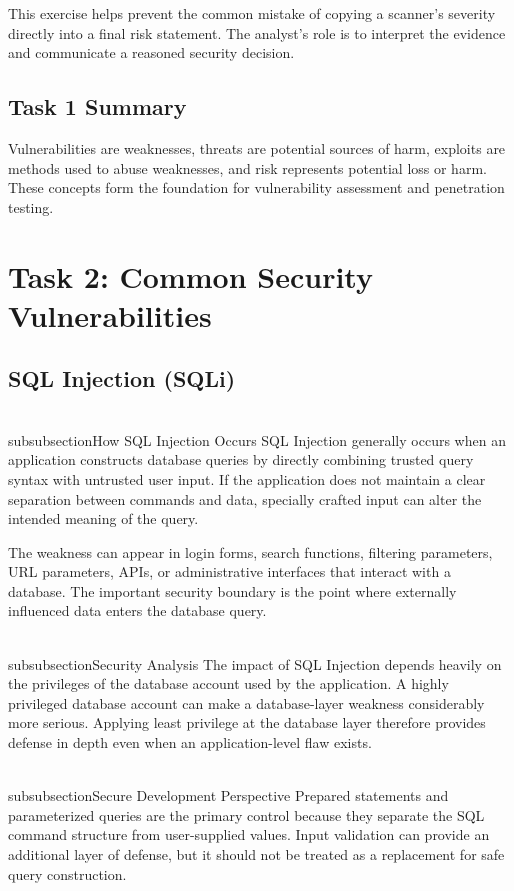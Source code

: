 \documentclass[11pt,a4paper]{article}
\begin{document}
This exercise helps prevent the common mistake of copying a scanner's severity directly into a final risk statement. The analyst's role is to interpret the evidence and communicate a reasoned security decision.

\subsection{Task 1 Summary}
Vulnerabilities are weaknesses, threats are potential sources of harm, exploits are methods used to abuse weaknesses, and risk represents potential loss or harm. These concepts form the foundation for vulnerability assessment and penetration testing.

\newpage
\section{Task 2: Common Security Vulnerabilities}

\subsection{SQL Injection (SQLi)}
\\subsubsection{How SQL Injection Occurs}
SQL Injection generally occurs when an application constructs database queries by directly combining trusted query syntax with untrusted user input. If the application does not maintain a clear separation between commands and data, specially crafted input can alter the intended meaning of the query.

The weakness can appear in login forms, search functions, filtering parameters, URL parameters, APIs, or administrative interfaces that interact with a database. The important security boundary is the point where externally influenced data enters the database query.

\\subsubsection{Security Analysis}
The impact of SQL Injection depends heavily on the privileges of the database account used by the application. A highly privileged database account can make a database-layer weakness considerably more serious. Applying least privilege at the database layer therefore provides defense in depth even when an application-level flaw exists.

\\subsubsection{Secure Development Perspective}
Prepared statements and parameterized queries are the primary control because they separate the SQL command structure from user-supplied values. Input validation can provide an additional layer of defense, but it should not be treated as a replacement for safe query construction.
\end{document}
